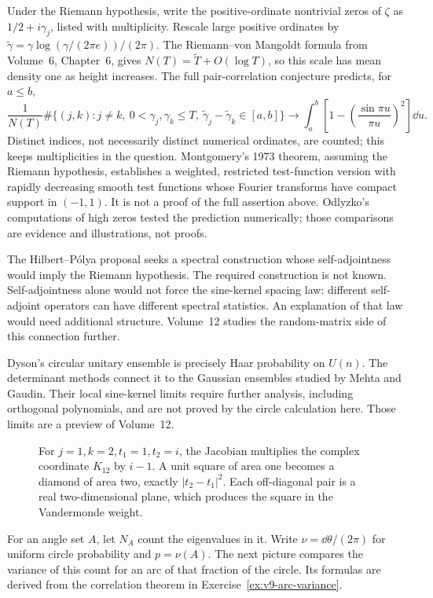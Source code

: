 \begin{beauty}
Under the Riemann hypothesis, write the positive-ordinate nontrivial zeros
of $\zeta$ as $1/2+i\gamma_j$, listed with multiplicity.
Rescale large positive ordinates by
$\widetilde\gamma=\gamma\log(\gamma/(2\pi e))/(2\pi)$.
The Riemann--von Mangoldt formula from Volume~6, Chapter~6, gives
$N(T)=\widetilde T+O(\log T)$, so this scale has mean density one
as height increases.
The full pair-correlation conjecture predicts, for $a\le b$,
\[
 \frac1{N(T)}\#\{(j,k):j\ne k,\ 0<\gamma_j,\gamma_k\le T,
       \ \widetilde\gamma_j-\widetilde\gamma_k\in[a,b]\}
 \longrightarrow\int_a^b
 \left[1-\left(\frac{\sin\pi u}{\pi u}\right)^2\right]\dd u.
\]
Distinct indices, not necessarily distinct numerical ordinates, are counted;
this keeps multiplicities in the question.
Montgomery's 1973 theorem, assuming the Riemann hypothesis, establishes a
weighted, restricted test-function version with rapidly decreasing smooth test functions whose Fourier transforms have
compact support in $(-1,1)$. It is not a proof of the full assertion above.
Odlyzko's computations of high zeros tested the prediction numerically;
those comparisons are evidence and illustrations, not proofs.

The Hilbert--P\'olya proposal seeks a spectral construction whose
self-adjointness would imply the Riemann hypothesis.
The required construction is not known. Self-adjointness alone would
not force the sine-kernel spacing law: different self-adjoint operators
can have different spectral statistics. An explanation of that law
would need additional structure. Volume~12 studies the random-matrix
side of this connection further.
\end{beauty}

\begin{remark}
Dyson's circular unitary ensemble is precisely Haar probability on $U(n)$.
The determinant methods connect it to the Gaussian ensembles studied by
Mehta and Gaudin. Their local sine-kernel limits require further analysis,
including orthogonal polynomials, and are not proved by the circle
calculation here. Those limits are a preview of Volume~12.
\end{remark}

\begin{figure}[ht]
\centering
{}
\caption{For $j=1,k=2,t_1=1,t_2=i$, the Jacobian multiplies the complex coordinate $K_{12}$ by $i-1$. A unit square of area one becomes a diamond of area two, exactly $|t_2-t_1|^2$. Each off-diagonal pair is a real two-dimensional plane, which produces the square in the Vandermonde weight.}
\label{fig:v9-jacobian-square}
\end{figure}
For an angle set $A$, let $N_A$ count the eigenvalues in it.
Write $\nu=\dd\theta/(2\pi)$ for uniform circle probability and
$p=\nu(A)$. The next picture compares the variance of this count for an arc
of that fraction of the circle. Its formulas are derived from the correlation theorem in
Exercise~\ref{ex:v9-arc-variance}.

